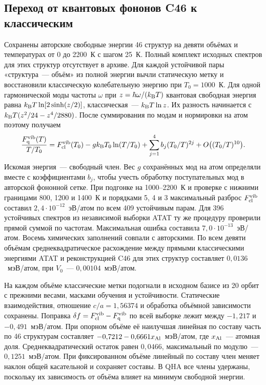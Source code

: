 \subsection*{Переход от квантовых фононов C46 к классическим}

Сохранены авторские свободные энергии 46 структур на девяти объёмах и
температурах от 0 до 2200~К с шагом 25~К. Полный комплект исходных
спектров для этих структур отсутствует в архиве. Для каждой устойчивой
пары «структура~--- объём» из полной энергии вычли статическую метку
и восстановили классическую колебательную энергию при \(T_0=1000\)~К.
Для одной гармонической моды частоты \(\omega\) при
\(z=\hbar\omega/(k_{\rm B}T)\) квантовая свободная энергия равна
\(k_{\rm B}T\ln[2\sinh(z/2)]\), классическая~--- \(k_{\rm B}T\ln z\).
Их разность начинается с \(k_{\rm B}T(z^2/24-z^4/2880)\).
После суммирования по модам и нормировки на атом поэтому получаем
\[
 \frac{F_{\rm q}^{\rm vib}(T)}{T/T_0}
 = F_{\rm cl}^{\rm vib}(T_0)
   -g k_{\rm B}T_0\ln(T/T_0)
   +\sum_{j=1}^{4} b_j(T_0/T)^{2j}
   +O\big((T_0/T)^{10}\big).
\]
Искомая энергия~--- свободный член. Вес \(g\) сохранённых мод на атом
определяли вместе с коэффициентами \(b_j\), чтобы учесть обработку
поступательных мод в авторской фононной сетке. При подгонке на
1000--2200~К и проверке с нижними границами 800, 1200 и 1400~К и
порядками 5, 4 и 3 максимальный разброс \(F_{\rm cl}^{\rm vib}\)
составил \(2{,}4\cdot10^{-12}\)~эВ/атом по всем 409 устойчивым парам.
Для 396 устойчивых спектров из независимой выборки ATAT ту же процедуру
проверили прямой суммой по частотам. Максимальная ошибка составила
\(7{,}0\cdot10^{-13}\)~эВ/атом. Восемь химических заполнений совпали
с авторскими. По всем девяти объёмам среднеквадратическое расхождение
между прямыми классическими энергиями ATAT и реконструкцией C46 для этих
структур составляет \(0{,}0136\)~мэВ/атом, при \(V_0\)~---
\(0{,}00104\)~мэВ/атом.

На каждом объёме классические метки подогнали в исходном базисе из
20 орбит с прежними весами, масками обучения и устойчивости.
Статические взаимодействия, отношение \(c/a=1{,}56374\) и обработка
объёмной зависимости сохранены. Поправка
\(\delta f=F_{\rm cl}^{\rm vib}-F_{\rm q}^{\rm vib}\) по всей выборке
лежит между \(-1{,}217\) и \(-0{,}491\)~мэВ/атом. При опорном объёме
её наилучшая линейная по составу часть по 46 структурам составляет
\(-0{,}7212-0{,}6661x_{\rm Al}\)~мэВ/атом, где \(x_{\rm Al}\)~---
атомная доля. Среднеквадратический остаток равен \(0{,}0466\), максимальный
по модулю~--- \(0{,}1251\)~мэВ/атом. При фиксированном объёме линейный
по составу член меняет наклон общей касательной и сохраняет составы.
В QHA все члены удержаны, поскольку их зависимость от объёма влияет на
минимум свободной энергии.

